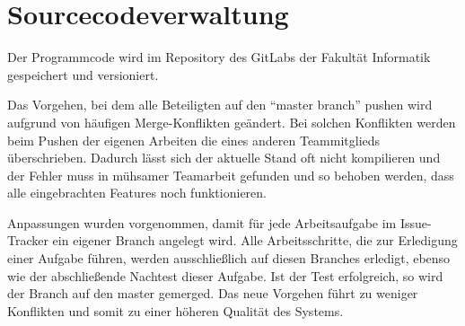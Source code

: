 
\section{Sourcecodeverwaltung}

Der Programmcode wird im Repository des GitLabs der Fakultät Informatik gespeichert und versioniert.

Das Vorgehen, bei dem alle Beteiligten auf den \enquote{master branch} pushen wird aufgrund von häufigen Merge-Konflikten geändert. Bei solchen Konflikten werden beim Pushen der eigenen Arbeiten die eines anderen Teammitglieds überschrieben. Dadurch lässt sich der aktuelle Stand oft nicht kompilieren und der Fehler muss in mühsamer Teamarbeit gefunden und so behoben werden, dass alle eingebrachten Features noch funktionieren.

Anpassungen wurden vorgenommen, damit für jede Arbeitsaufgabe im Issue-Tracker ein eigener Branch angelegt wird. Alle Arbeitsschritte, die zur Erledigung einer Aufgabe führen, werden ausschließlich auf diesen Branches erledigt, ebenso wie der abschließende Nachtest dieser Aufgabe. Ist der Test erfolgreich, so wird der Branch auf den master gemerged. Das neue Vorgehen führt zu weniger Konflikten und somit zu einer höheren Qualität des Systems.
